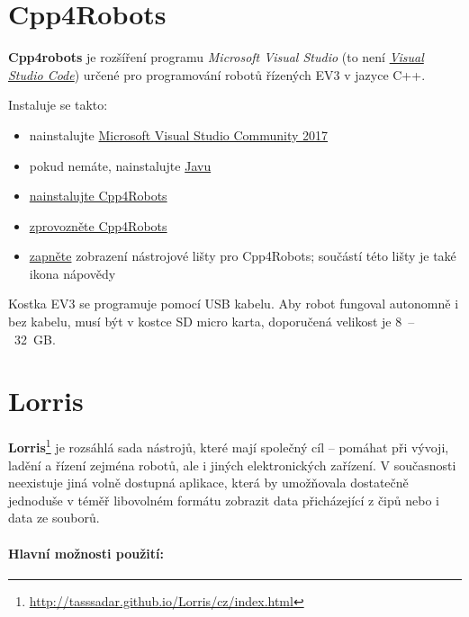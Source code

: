  
 \section{Cpp4Robots}  \label{Cpp4Robots}
 
 \textbf{Cpp4robots} je rozšíření programu \textit{Microsoft Visual Studio} (to není \textit{ \hyperref[vscode]{Visual Studio Code}}) určené pro programování robotů řízených  EV3 v jazyce C++.
 
 Instaluje se takto: 
 
 \begin{itemize}
 	\item nainstalujte \href{https://visualstudio.microsoft.com/cs/thank-you-downloading-visual-studio/?sku=Community&rel=15}{Microsoft Visual Studio Community 2017}
 	\item pokud nemáte, nainstalujte \href{http://www.oracle.com/technetwork/java/javase/downloads/jdk8-downloads-2133151.html}{Javu}
 	\item  \href{http://www.cpp4robots.cz/Cpp4Robots_Install_Extension.html}{nainstalujte Cpp4Robots}
 	\item  \href{http://www.cpp4robots.cz/Cpp4Robots_Extension_Enable.html}{zprovozněte Cpp4Robots}
 	\item \href{http://www.cpp4robots.cz/LegoEV3_ShowToolbar.html}{zapněte} zobrazení nástrojové lišty pro Cpp4Robots; součástí této lišty je také ikona nápovědy
 \end{itemize}
 
 Kostka EV3 se programuje pomocí USB kabelu. 
 Aby robot fungoval autonomně i bez kabelu, musí být v kostce SD micro karta, doporučená velikost je 8~--~32~GB. 
 
 
 
 
 
 \section{Lorris} \label{lorris}
 
 {\bf Lorris}\footnote{\url{http://tasssadar.github.io/Lorris/cz/index.html}}  je rozsáhlá sada nástrojů, které mají společný cíl -- pomáhat při vývoji, ladění a řízení zejména robotů, ale i jiných elektronických zařízení. V současnosti neexistuje jiná volně dostupná aplikace, která by umožňovala dostatečně jednoduše v téměř libovolném formátu zobrazit data přicházející z čipů nebo i data ze souborů. 
 
\paragraph{ Hlavní možnosti použití: }

